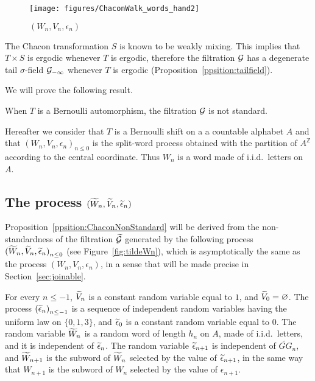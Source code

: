 \documentclass[12pt,a4paper]{article}
\begin{document}
\begin{figure}[!h]
\centering
	\texttt{[image: figures/ChaconWalk\_words\_hand2]}
\caption{$(W_n, V_n, \epsilon_n)$}
\label{fig:ChaconSplitWord}
\end{figure}

The Chacon transformation $S$ is known to be weakly mixing. 
This implies that $T \times S$ is ergodic whenever $T$ is ergodic, 
therefore the filtration $\mathcal{G}$ has a degenerate tail $\sigma$-field 
$\mathcal{G}_{-\infty}$ whenever $T$ is ergodic (Proposition~\ref{ppsition:tailfield}). 

We will prove the following result.

\begin{ppsition}\label{ppsition:ChaconNonStandard}
When $T$ is a Bernoulli automorphism, the filtration $\mathcal{G}$ is not standard.
\end{ppsition}

Hereafter we consider that $T$ is a Bernoulli shift on a 
a countable alphabet $A$ and that  ${(W_n, V_n, \epsilon_n)}_{n \leq 0}$ 
is the split-word process obtained with the partition of 
$A^{\mathbb{Z}}$ according to the central coordinate. 
Thus $W_n$ is a word made of i.i.d.\ letters on $A$. 

\subsection{The process $(\widetilde{W}_n, \widetilde{V}_n, \widetilde{\epsilon}_n)$}


Proposition~\ref{ppsition:ChaconNonStandard} will be derived from the 
non-standardness of the filtration $\widetilde{\mathcal{G}}$ generated by 
the following process ${(\widetilde{W}_n, \widetilde{V}_n, \widetilde{\epsilon}_n)}_{n \leq 0}$ 
(see Figure~\ref{fig:tildeWn}), 
which is asymptotically the same as the process $(W_n, V_n, \epsilon_n)$, 
in a sense that will be made precise in Section~\ref{sec:joinable}.


For every $n \leq -1$, $\widetilde{V}_n$ is a constant random variable equal to $1$, 
and $\widetilde{V}_0=\varnothing$. 
The process ${(\widetilde{\epsilon}_n)}_{n \leq -1}$ is a sequence of independent random 
variables having the uniform law on $\{0,1,3\}$, and $\widetilde{\epsilon}_0$ is a 
constant random variable equal to $0$. 
The random variable $\widetilde{W}_n$ is a random word of length $h_n$ on $A$, 
made of i.i.d.\ letters, and  it is 
independent of $\widetilde{\epsilon}_n$. 
The random variable $\widetilde{\epsilon}_{n+1}$ is independent of $\widetilde{GG}_n$, and 
$\widetilde{W}_{n+1}$ is the subword of $\widetilde{W}_n$ selected by the value of $\widetilde{\epsilon}_{n+1}$, 
in the same way that $W_{n+1}$ is the subword of $W_n$ selected by the value of $\epsilon_{n+1}$.
\end{document}
